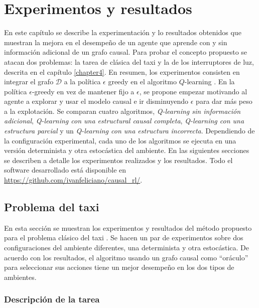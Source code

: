 \chapter{Experimentos y resultados}\label{chapter5}

\graphicspath{{Chapter5/Figs/}}


En este capítulo se describe la experimentación y lo resultados obtenidos
que muestran la mejora en el desempeño de un agente que aprende
con y sin información adicional de un grafo causal.
Para probar el concepto propuesto se atacan dos problemas: la tarea de clásica del taxi \cite{Dietterich:2000:HRL:1622262.1622268} y la de los
interruptores de luz, descrita en el capítulo \ref{chapter4}.
En resumen, los experimentos consisten en integrar el grafo $\mathcal{D}$ a la política $\epsilon$ greedy
en el algoritmo $Q$-learning \cite{watkins1992q}.
En la política $\epsilon$-greedy en vez de mantener fijo a $\epsilon$, se propone empezar motivando al agente a explorar y usar
el modelo causal e ir disminuyendo $\epsilon$ para dar más peso a la explotación.
Se comparan cuatro algoritmos, \textit{Q-learning sin información
adicional}, \textit{Q-learning con una estructural causal completa}, \textit{Q-learning con una estructura parcial} y un \textit{Q-learning con una estructura incorrecta}.
Dependiendo de la configuración experimental, cada uno de los algoritmos se ejecuta en una versión determinista y otra estocástica del ambiente. 
En las siguientes secciones se describen a detalle los experimentos realizados y los resultados. Todo el software desarrollado está 
disponible en \url{https://github.com/ivanfeliciano/causal_rl/}.


\section{Problema del taxi}

En esta sección se muestran los experimentos y resultados del método propuesto para el problema clásico del taxi \cite{Dietterich:2000:HRL:1622262.1622268}.
Se hacen un par de experimentos sobre dos configuraciones del ambiente diferentes,
una determinista y otra estocástica. De acuerdo con los resultados, 
el algoritmo usando un grafo causal como ``oráculo'' para seleccionar sus acciones
tiene un mejor desempeño en los dos tipos de ambientes.

\subsection{Descripción de la tarea}

